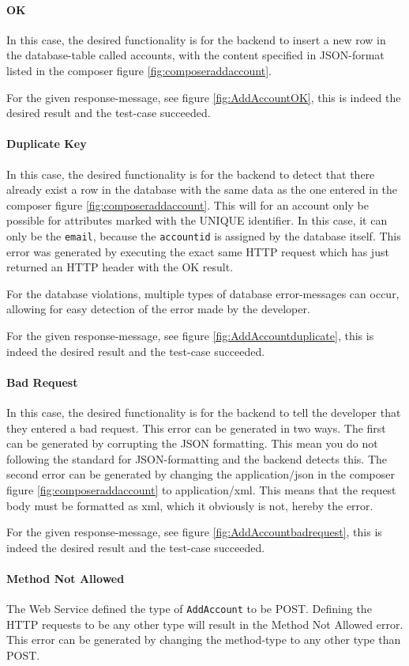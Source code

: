 \paragraph{OK}
In this case, the desired functionality is for the backend to insert a new row in the database-table called accounts, with the content specified in JSON-format listed in the composer figure \ref{fig:composeraddaccount}. 

For the given response-message, see figure \ref{fig:AddAccountOK}, this is indeed the desired result and the test-case succeeded.
\paragraph{Duplicate Key}
In this case, the desired functionality is for the backend to detect that there already exist a row in the database with  the same data as the one entered in the composer figure \ref{fig:composeraddaccount}. This will for an account only be possible for attributes marked with the UNIQUE identifier. In this case, it can only be the \texttt{email}, because the \texttt{accountid} is assigned by the database itself. This error was generated by executing the exact same HTTP request which has just returned an HTTP header with the OK result.

For the database violations, multiple types of database error-messages can occur, allowing for easy detection of the error made by the developer.

For the given response-message, see figure \ref{fig:AddAccountduplicate}, this is indeed the desired result and the test-case succeeded.
\paragraph{Bad Request}
In this case, the desired functionality is for the backend to tell the developer that they entered a bad request. This error can be generated in two ways. The first can be generated by corrupting the JSON formatting. This mean you do not following the standard for JSON-formatting and the backend detects this. The second error can be generated by changing the application/json in the composer figure \ref{fig:composeraddaccount} to application/xml. This means that the request body must be formatted as xml, which it obviously is not, hereby the error.

For the given response-message, see figure \ref{fig:AddAccountbadrequest}, this is indeed the desired result and the test-case succeeded.
\paragraph{Method Not Allowed}
The Web Service defined the type of \texttt{AddAccount} to be POST. Defining the HTTP requests to be any other type will result in the Method Not Allowed error. This error can be generated by changing the method-type to any other type than POST.

